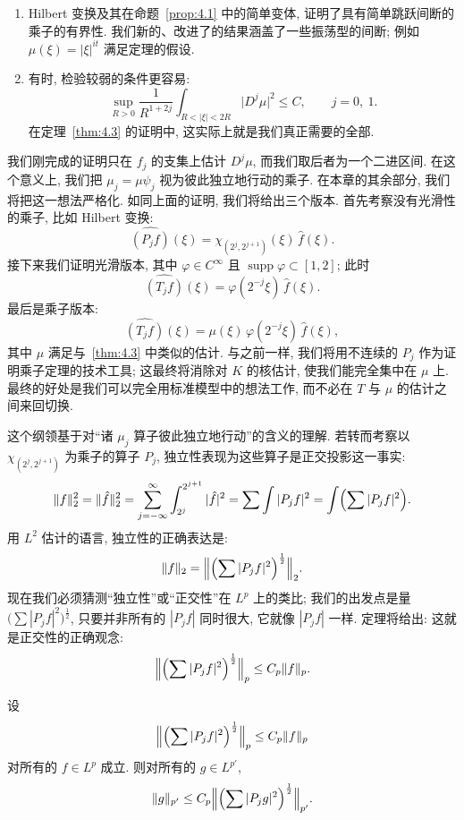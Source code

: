 \begin{remark}\label{rem:4.4}
\begin{enumerate}[label=\alph*)]
\item Hilbert 变换及其在命题~\ref{prop:4.1} 中的简单变体, 证明了具有简单跳跃间断的乘子的有界性. 我们新的、改进了的结果涵盖了一些振荡型的间断; 例如 $\mu(\xi)=|\xi|^{it}$ 满足定理的假设.
\item 有时, 检验较弱的条件更容易:
\[
\sup_{R>0}\frac{1}{R^{1+2j}}\int_{R<|\xi|<2R}\bigl|D^{j}\mu\bigr|^{2}\leq C,\qquad j=0,\ 1.
\]
在定理~\ref{thm:4.3} 的证明中, 这实际上就是我们真正需要的全部.
\end{enumerate}
\end{remark}


我们刚完成的证明只在 $f_j$ 的支集上估计 $D^j\mu$, 而我们取后者为一个二进区间. 在这个意义上, 我们把 $\mu_j=\mu\psi_j$ 视为彼此独立地行动的乘子. 在本章的其余部分, 我们将把这一想法严格化. 如同上面的证明, 我们将给出三个版本. 首先考察没有光滑性的乘子, 比如 Hilbert 变换:
\[
\widehat{\left(P_{j}f\right)}(\xi)=\chi_{(2^{j},2^{j+1})}(\xi)\,\hat{f}(\xi).
\]
接下来我们证明光滑版本, 其中 $\varphi\in C^\infty$ 且 $\operatorname{supp}\varphi\subset[1,2]$; 此时
\[
\widehat{\left(T_{j}f\right)}(\xi)=\varphi(2^{-j}\xi)\,\hat{f}(\xi).
\]
最后是乘子版本:
\[
\widehat{\left(T_{j}f\right)}(\xi)=\mu(\xi)\,\varphi(2^{-j}\xi)\,\hat{f}(\xi),
\]
其中 $\mu$ 满足与~\ref*{thm:4.3} 中类似的估计. 与之前一样, 我们将用不连续的 $P_j$ 作为证明乘子定理的技术工具; 这最终将消除对 $K$ 的核估计, 使我们能完全集中在 $\mu$ 上. 最终的好处是我们可以完全用标准模型中的想法工作, 而不必在 $T$ 与 $\mu$ 的估计之间来回切换.

这个纲领基于对``诸 $\mu_j$ 算子彼此独立地行动''的含义的理解. 若转而考察以 $\chi_{(2^j,2^{j+1})}$ 为乘子的算子 $P_j$, 独立性表现为这些算子是正交投影这一事实:
\[
\|f\|_{2}^{2}=\|\hat{f}\|_{2}^{2}=\sum_{j=-\infty}^{\infty}\int_{2^{j}}^{2^{j+1}}|\hat{f}|^{2}
=\sum\int|P_{j}f|^{2}=\int\Bigl(\sum|P_{j}f|^{2}\Bigr).
\]
用 $L^{2}$ 估计的语言, 独立性的正确表达是:
\[
\|f\|_{2}=\Bigl\|\Bigl(\sum|P_{j}f|^{2}\Bigr)^{\frac{1}{2}}\Bigr\|_{2}.
\]
现在我们必须猜测``独立性''或``正交性''在 $L^p$ 上的类比; 我们的出发点是量 $\bigl(\sum|P_jf|^2\bigr)^{\frac{1}{2}}$, 只要并非所有的 $|P_jf|$ 同时很大, 它就像 $|P_jf|$ 一样. 定理将给出: 这就是正交性的正确观念:
\[
\Bigl\|\Bigl(\sum|P_{j}f|^{2}\Bigr)^{\frac{1}{2}}\Bigr\|_{p}\leq C_{p}\|f\|_{p}.
\]

\begin{lemma}\label{lem:4.6}
设
\[
\Bigl\|\Bigl(\sum|P_{j}f|^{2}\Bigr)^{\frac{1}{2}}\Bigr\|_{p}\leq C_{p}\|f\|_{p}
\]
对所有的 $f\in L^{p}$ 成立. 则对所有的 $g\in L^{p'}$,
\[
\|g\|_{p'}\leq C_{p}\Bigl\|\Bigl(\sum|P_{j}g|^{2}\Bigr)^{\frac{1}{2}}\Bigr\|_{p'}.
\]
\end{lemma}

